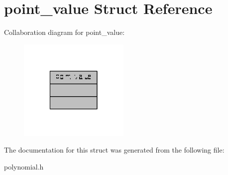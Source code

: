 \hypertarget{structpoint__value}{\section{point\-\_\-value Struct Reference}
\label{structpoint__value}
}


Collaboration diagram for point\-\_\-value\-:
\nopagebreak
\begin{figure}[H]
\begin{center}
\leavevmode
\includegraphics[width=150pt]{structpoint__value__coll__graph}
\end{center}
\end{figure}


The documentation for this struct was generated from the following file\-:\begin{DoxyCompactItemize}
\item 
polynomial.\-h\end{DoxyCompactItemize}
